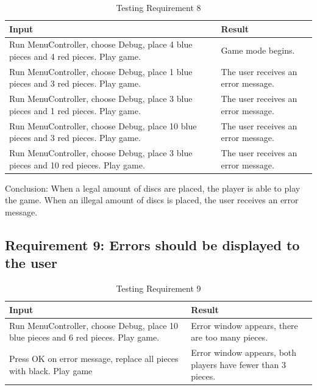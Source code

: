 \documentclass{article}
\begin{document}
{\begin{table} [h]
	\centering
	\caption{Testing Requirement 8}
    \begin{tabular}{|p{6cm}|p{6cm}|}
        \hline
       	\textbf{Input} & \textbf{Result} \\ \hline
       Run MenuController, choose Debug, place 4 blue pieces and 4 red pieces. Play game. & Game mode begins. \\ \hline
       Run MenuController, choose Debug, place 1 blue pieces and 3 red pieces. Play game. & The user receives an error message. \\ \hline
       Run MenuController, choose Debug, place 3 blue pieces and 1 red pieces. Play game. & The user receives an error message. \\ \hline
        Run MenuController, choose Debug, place 10 blue pieces and 3 red pieces. Play game. & The user receives an error message. \\ \hline
      Run MenuController, choose Debug, place 3 blue pieces and 10 red pieces. Play game. & The user receives an error message. \\
        \hline
    \end{tabular}
\end{table}

Conclusion: When a legal amount of discs are placed, the player is able to play the game. When an illegal amount of discs is placed, the user receives an error message.

\newpage
\subsection{Requirement 9: Errors should be displayed to the user}

\begin{table} [h]
	\centering
	\caption{Testing Requirement 9}
    \begin{tabular}{|p{6cm}|p{6cm}|}
        \hline
       	\textbf{Input} & \textbf{Result} \\ \hline
       Run MenuController, choose Debug, place 10 blue pieces and 6 red pieces. Play game. & Error window appears, there are too many pieces. \\ \hline
      Press OK on error message, replace all pieces with black. Play game & Error window appears, both players have fewer than 3 pieces. \\
        \hline
    \end{tabular}
\end{table}

}
\end{document}
